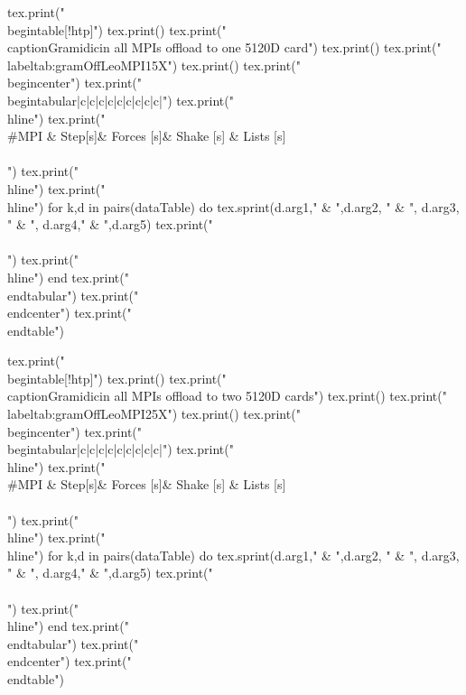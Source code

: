\begin{luacode*}
  tex.print("\\begin{table}[!htp]")
  tex.print()
  tex.print("\\caption{Gramidicin all MPIs offload to one 5120D card}")
  tex.print()
  tex.print("\\label{tab:gramOffLeoMPI15X}")
  tex.print()
  tex.print("\\begin{center}")
  tex.print("\\begin{tabular}{|c|c|c|c|c|c|c|c|c|}")
  tex.print("\\hline")
  tex.print("\\#MPI & Step[s]& Forces [s]& Shake [s] & Lists [s]\\\\")
  tex.print("\\hline")
  tex.print("\\hline")
  for k,d in pairs(dataTable) do
    tex.sprint(d.arg1," & ",d.arg2, " & ", d.arg3, " & ", d.arg4," & ",d.arg5)
    tex.print(" \\\\")
    tex.print("\\hline")
  end
  tex.print("\\end{tabular}")
  tex.print("\\end{center}")
  tex.print("\\end{table}")
\end{luacode*}
\begin{luacode*}
  tex.print("\\begin{table}[!htp]")
  tex.print()
  tex.print("\\caption{Gramidicin all MPIs offload to two 5120D cards}")
  tex.print()
  tex.print("\\label{tab:gramOffLeoMPI25X}")
  tex.print()
  tex.print("\\begin{center}")
  tex.print("\\begin{tabular}{|c|c|c|c|c|c|c|c|c|}")
  tex.print("\\hline")
  tex.print("\\#MPI & Step[s]& Forces [s]& Shake [s] & Lists [s]\\\\")
  tex.print("\\hline")
  tex.print("\\hline")
  for k,d in pairs(dataTable) do
    tex.sprint(d.arg1," & ",d.arg2, " & ", d.arg3, " & ", d.arg4," & ",d.arg5)
    tex.print(" \\\\")
    tex.print("\\hline")
  end
  tex.print("\\end{tabular}")
  tex.print("\\end{center}")
  tex.print("\\end{table}")
\end{luacode*}
